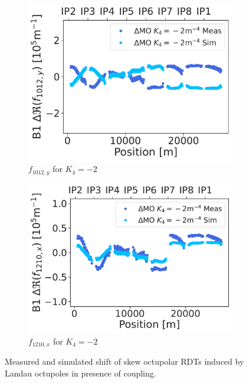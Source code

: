 \begin{figure}[!htb]
    \begin{subfigure}{0.47\textwidth}
        \includegraphics[width=\textwidth]{./images/skew_octupoles/responses_coupling/f1012_response_meas_sim_-2_REAL.pdf}
        \caption{$f_{1012,y}$ for $K_4 = -2$}
    \end{subfigure}
    \hfill
    \begin{subfigure}{0.47\textwidth}
        \includegraphics[width=\textwidth]{./images/skew_octupoles/responses_coupling/f1210_response_meas_sim_-2_REAL.pdf}
        \caption{$f_{1210,x}$ for $K_4 = -2$}
    \end{subfigure}
    \caption{Measured and simulated shift of skew octupolar RDTs induced by Landau octupoles in
    presence of coupling.}
    \label{fig:skew_octupolar:response_meas_sim_coupling}
\end{figure}


